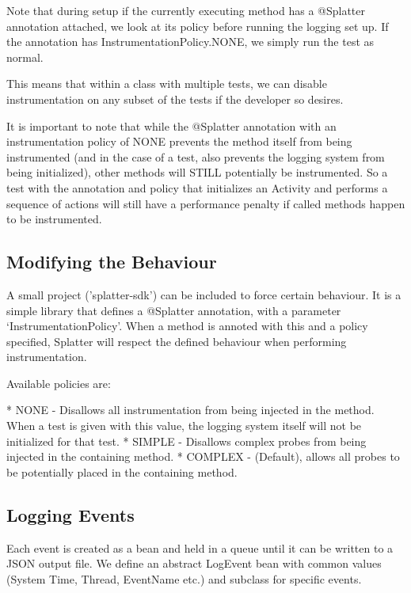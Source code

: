 Note that during setup if the currently executing method has a @Splatter annotation attached, we look at its policy before running the logging set up. If the annotation has InstrumentationPolicy.NONE, we simply run the test as normal.

This means that within a class with multiple tests, we can disable instrumentation on any subset of the tests if the developer so desires.

It is important to note that while the @Splatter annotation with an instrumentation policy of NONE prevents the method itself from being instrumented (and in the case of a test, also prevents the logging system from being initialized), other methods will STILL potentially be instrumented. So a test with the annotation and policy that initializes an Activity and performs a sequence of actions will still have a performance penalty if called methods happen to be instrumented.

\subsection{Modifying the Behaviour}

A small project ('splatter-sdk') can be included to force certain behaviour. It is a simple library that defines a @Splatter annotation, with a parameter {\lq}InstrumentationPolicy{\rq}. When a method is annoted with this and a policy specified, Splatter will respect the defined behaviour when performing instrumentation.

Available policies are:

* NONE - Disallows all instrumentation from being injected in the method. When a test is given with this value, the logging system itself will not be initialized for that test.
* SIMPLE - Disallows complex probes from being injected in the containing method.
* COMPLEX - (Default), allows all probes to be potentially placed in the containing method.

\subsection{Logging Events}

Each event is created as a bean and held in a queue until it can be written to a JSON output file. We define an abstract LogEvent bean with common values (System Time, Thread, EventName etc.) and subclass for specific events.

